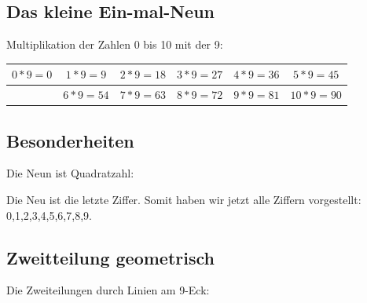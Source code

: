 \documentclass[a4paper]{amsart}
\theoremstyle{definition}
\begin{document}
\subsection{Das kleine Ein-mal-Neun}
Multiplikation der Zahlen 0 bis 10 mit der 9:
\vspace{\kategoryVspace}

\begin{tabular}{|c|c|c|c|c|c|}
   \hline
   $0 * 9 = 0$ & $1 * 9 = 9$ & $2 * 9 = 18$ & $3 * 9 = 27$ & $4 * 9 = 36$ & $5 * 9 = 45$\\ 
   \hline
   & $6 * 9 = 54$ & $7 * 9 = 63$ & $8 * 9 = 72$ & $9 * 9 = 81$ & $10 * 9 = 90$ \\
   \hline
\end{tabular}

\subsection{Besonderheiten}
Die Neun ist Quadratzahl:


Die Neu ist die letzte Ziffer. Somit haben wir jetzt alle Ziffern vorgestellt: 0,1,2,3,4,5,6,7,8,9.



\subsection{Zweitteilung geometrisch}
Die Zweiteilungen durch Linien am 9-Eck:

\vspace{\kategoryVspace}
\end{document}
